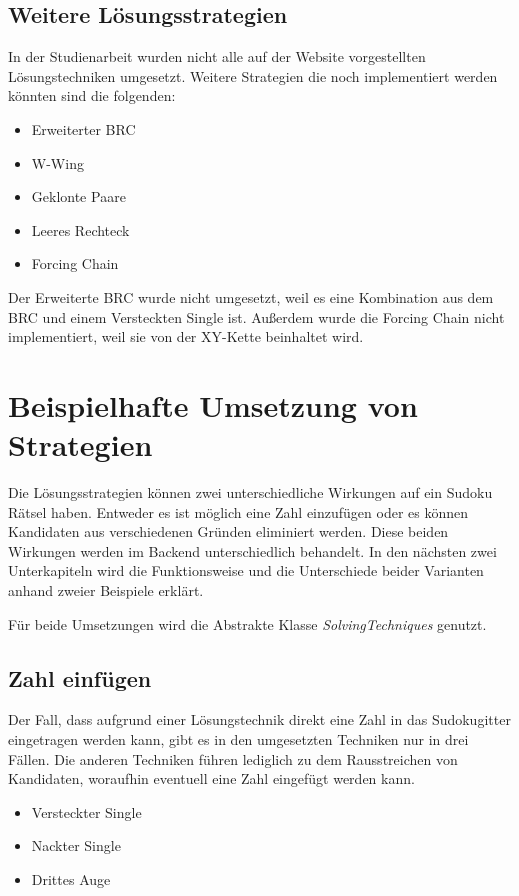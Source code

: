 \subsection{Weitere Lösungsstrategien}
In der Studienarbeit wurden nicht alle auf der Website \cite{martin} vorgestellten Lösungstechniken umgesetzt. Weitere Strategien die noch implementiert werden könnten sind die folgenden:
\begin{itemize}
	\item Erweiterter \ac{BRC}
	\item W-Wing
	\item Geklonte Paare
	\item Leeres Rechteck
	\item Forcing Chain
\end{itemize}

Der Erweiterte \ac{BRC} wurde nicht umgesetzt, weil es eine Kombination aus dem \ac{BRC} und einem Versteckten Single ist. Außerdem wurde die Forcing Chain nicht implementiert, weil sie von der XY-Kette beinhaltet wird.

\section{Beispielhafte Umsetzung von Strategien}
Die Lösungsstrategien können zwei unterschiedliche Wirkungen auf ein Sudoku Rätsel haben. Entweder es ist möglich eine Zahl einzufügen oder es können Kandidaten aus verschiedenen Gründen eliminiert werden. Diese beiden Wirkungen werden im Backend unterschiedlich behandelt. In den nächsten zwei Unterkapiteln wird die Funktionsweise und die Unterschiede beider Varianten anhand zweier Beispiele erklärt. 

Für beide Umsetzungen wird die Abstrakte Klasse \textit{SolvingTechniques} genutzt.

\subsection{Zahl einfügen}

Der Fall, dass aufgrund einer Lösungstechnik direkt eine Zahl in das Sudokugitter eingetragen werden kann, gibt es in den umgesetzten Techniken nur in drei Fällen. Die anderen Techniken führen lediglich zu dem Rausstreichen von Kandidaten, woraufhin eventuell eine Zahl eingefügt werden kann.
\begin{itemize}
	\item Versteckter Single
	\item Nackter Single
	\item Drittes Auge
\end{itemize}

